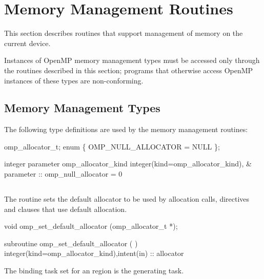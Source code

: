 \section{Memory Management Routines}
\label{sec:Memory Management Routines}
This section describes routines that support management of memory on the current device.

Instances of OpenMP memory management types must be accessed only through the routines described in this section; programs that otherwise access OpenMP instances of these types are non-conforming.

\subsection{Memory Management Types}
\label{subsec:Memory Management Types}

The following type definitions are used by the memory management routines:

\begin{ccppspecific}
\begin{codepar}
omp_allocator_t;
enum \{ OMP_NULL_ALLOCATOR = NULL \};
\end{codepar}
\end{ccppspecific}

\begin{fortranspecific}
\begin{codepar}
integer parameter omp_allocator_kind
integer(kind=omp_allocator_kind), &
        parameter :: omp_null_allocator = 0
\end{codepar}
\end{fortranspecific}

\subsection{}
\label{subsec:omp_set_default_allocator}

\summary
The  routine sets the default allocator to be used by allocation calls, directives and clauses that use default allocation.

\format
\ccppspecificstart
\begin{boxedcode}
void omp_set_default_allocator (omp_allocator_t *);
\end{boxedcode}
\ccppspecificend
\fortranspecificstart
\begin{boxedcode}
subroutine omp_set_default_allocator (  )
integer(kind=omp_allocator_kind),intent(in) :: allocator
\end{boxedcode}
\fortranspecificend
\binding
The binding task set for an  region is the generating task.

